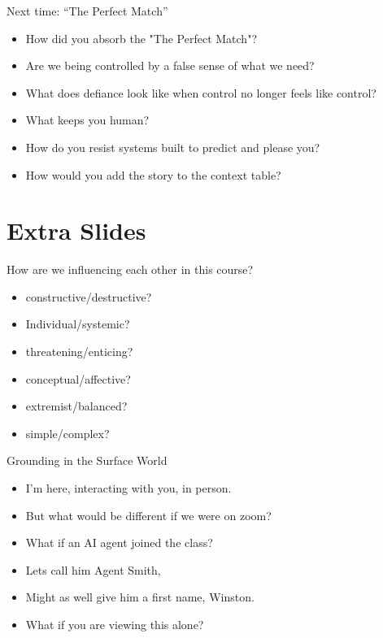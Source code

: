 \documentclass[
  ignorenonframetext,
]{beamer}
\providecommand{\tightlist}{%
  \setlength{\itemsep}{0pt}\setlength{\parskip}{0pt}}
\newcommand{\Cgreen}[1]{\textcolor{green!70!black}{#1}}
\newcommand{\Cbrown}[1]{\textcolor{brown!90!black}{#1}}
\newcommand{\Cpurple}[1]{\textcolor{purple!90!black}{#1}}
\newcommand{\Cteal}[1]{\textcolor{teal!90!black}{#1}} %
\begin{document}
\begin{frame}{Next time: ``The Perfect Match''}
\protect{}\label{next-time-the-perfect-match}
\begin{itemize}
\item
  \Cteal{How did you absorb the "The Perfect Match"?}
\item
  \Cteal{Are we being controlled by a false sense of what we need?}
\item
  \Cteal{What does defiance look like when control no longer feels like control?}
\item
  \Cpurple{What keeps you human?}
\item
  \Cpurple{How do you resist systems built to predict and please you?}
\item
  \Cbrown{How would you add the story to the context table?}
\end{itemize}
\end{frame}

\section{Extra Slides}\label{extra-slides}

\begin{frame}{How are we influencing each other in this course?}
\protect{}\label{how-are-we-influencing-each-other-in-this-course}
\begin{itemize}
\tightlist
\item
  constructive/destructive?\\
\item
  Individual/systemic?\\
\item
  threatening/enticing?\\
\item
  conceptual/affective?\\
\item
  extremist/balanced?
\item
  simple/complex?
\end{itemize}
\end{frame}

\begin{frame}{Grounding in the Surface World}
\protect{}\label{grounding-in-the-surface-world}
\begin{itemize}
\item
  \Cpurple{I'm here, interacting with you, in person.} \vspace*{0.4in}
\item
  \Cgreen{But what would be different if we were on zoom?}
\item
  \Cgreen{What if an AI agent joined the class?}
\item
  \Cgreen{Lets call him Agent Smith,}
\item
  \Cgreen{Might as well give him a first name, Winston.} \vspace*{0.4in}
\item
  What if you are viewing this alone?
\end{itemize}
\end{frame}
\end{document}
